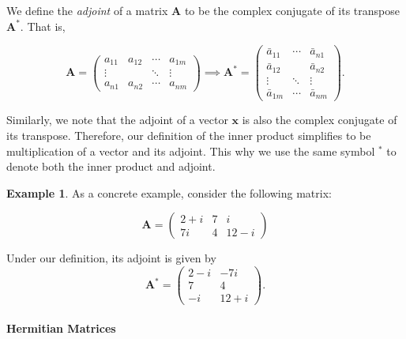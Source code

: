 \documentclass[12pt]{article}
\renewcommand{\vec}[1]{\mathbf{#1}}
\theoremstyle{definition}
\newtheorem{exmp}[thm]{Example}
\theoremstyle{remark}
\numberwithin{equation}{section}
\begin{document}
We define the \emph{adjoint} of a matrix $\vec{A}$ to be the complex conjugate of its transpose $\vec{A}^*$. That is,

\begin{equation}
  \vec{A} = \begin{pmatrix}
    a_{11} & a_{12} & \cdots & a_{1m} \\
    \vdots &        & \ddots & \vdots \\
    a_{n1} & a_{n2} & \cdots & a_{nm}
  \end{pmatrix} \implies
  \vec{A}^* = \begin{pmatrix}
    \bar{a}_{11} & \cdots & \bar{a}_{n1} \\
    \bar{a}_{12} &        & \bar{a}_{n2} \\
    \vdots       & \ddots & \vdots \\
    \bar{a}_{1m} & \cdots & \bar{a}_{nm}
  \end{pmatrix}. 
\end{equation}

Similarly, we note that the adjoint of a vector $\vec{x}$ is also the complex conjugate of its transpose. Therefore, our definition of the inner product simplifies to be multiplication of a vector and its adjoint. This why we use the same symbol $^*$ to denote both the inner product and adjoint.
\begin{exmp}
As a concrete example, consider the following matrix:

\begin{equation}
  \vec{A} = \begin{pmatrix}
    2 + i & 7 & i \\
    7i & 4 & 12 - i 
  \end{pmatrix}
\end{equation}

Under our definition, its adjoint is given by
\begin{equation}
  \vec{A}^* = \begin{pmatrix}
    2-i & -7i \\
    7   & 4   \\ 
    -i  & 12 + i
  \end{pmatrix}. 
\end{equation}
\end{exmp}


\paragraph{Hermitian Matrices}%
\label{par:hermitian_matrices}
\end{document}
